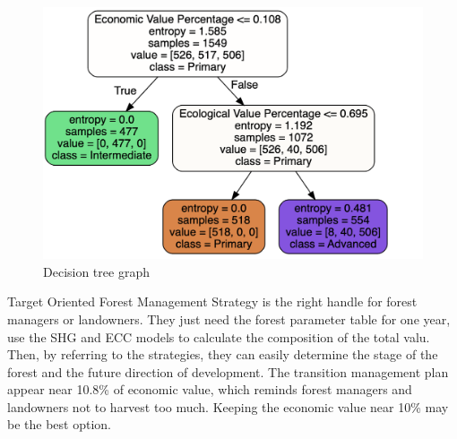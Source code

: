 \begin{figure}[H]
\centering
\includegraphics[scale = 0.45]{mcmthesis-demo/figures/Decision Tree Graph.png}
\caption{Decision tree graph} 
\end{figure}

Target Oriented Forest Management Strategy is the right handle for forest managers or landowners. They just need the forest parameter table for one year, use the SHG and ECC models to calculate the composition of the total valu. Then, by referring to the strategies, they can easily determine the stage of the forest and the future direction of development. The transition management plan appear near 10.8\% of economic value, which reminds forest managers and landowners not to harvest too much. Keeping the economic value near 10\% may be the best option.
